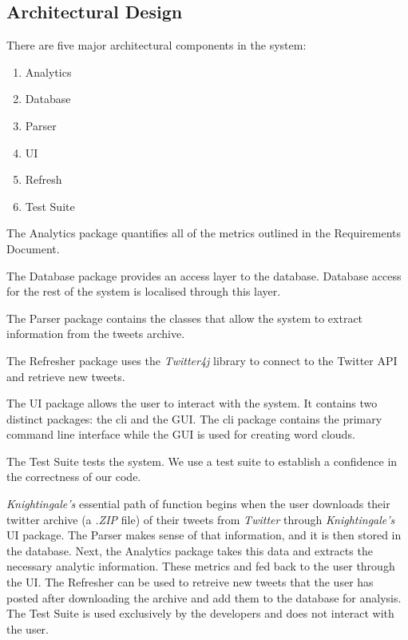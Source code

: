 \documentclass[a4paper, 12pt]{article}
\begin{document}
\subsection{Architectural Design} \label{sec:design}
\begin{adjustwidth}{2em}{0pt}
There are five major architectural components in the system:
\begin{enumerate}
\item Analytics
\item Database
\item Parser
\item UI
\item Refresh
\item Test Suite
\end{enumerate}

\noindent The Analytics package quantifies all of the metrics outlined in the Requirements Document. \newline

\noindent The Database package provides an access layer to the database. Database access for the rest of the system is localised through this layer.\newline

\noindent The Parser package contains the classes that allow the system to extract information from the tweets archive. \newline

\noindent The Refresher package uses the \textit{Twitter4j} library to connect to the Twitter API and retrieve new tweets. \newline

\noindent The UI package allows the user to interact with the system. It contains two distinct packages: the cli and the GUI. The cli package contains the primary command line interface while the GUI is used for creating word clouds. \newline

\noindent The Test Suite tests the system. We use a test suite to establish a confidence in the correctness of our code. \newline

\noindent \textit{Knightingale's} essential path of function begins when the user downloads their twitter archive (a \textit{.ZIP} file) of their tweets from \textit{Twitter} through \textit{Knightingale's} UI package. The Parser makes sense of that information, and it is then stored in the database. Next, the Analytics package takes this data and extracts the necessary analytic information. These metrics and fed back to the user through the UI. The Refresher can be used to retreive new tweets that the user has posted after downloading the archive and add them to the database for analysis. The Test Suite is used exclusively by the developers and does not interact with the user.
\end{adjustwidth}
\end{document}
